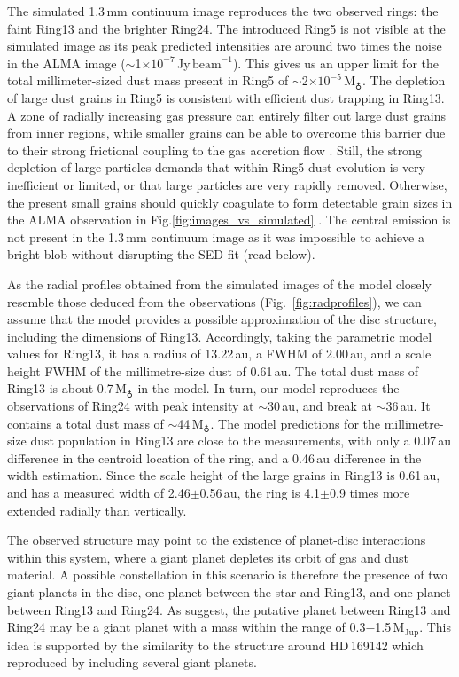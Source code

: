 \documentclass[usenatbib,times]{mnras}
\begin{document}
The simulated 1.3\,mm continuum image reproduces the two observed rings: the faint Ring13 and the brighter Ring24. The introduced Ring5 is not visible at the simulated image as its peak predicted intensities are around two times the noise in the ALMA image ($\sim$1$\times10^{-7}$\,Jy\,$\mathrm{beam}^{-1}$). This gives us an upper limit for the total millimeter-sized dust mass present in Ring5 of $\sim$2$\times10^{-5}$\,M$_{\earth}$. The depletion of large dust grains in Ring5 is consistent with efficient dust trapping in Ring13. A zone of radially increasing gas pressure can entirely filter out large dust grains from inner regions, while smaller grains can be able to overcome this barrier due to their strong frictional coupling to the gas accretion flow \citep[studied in the context of planetary gaps,][]{Rice2006,Zhu2012,Weber2018}. Still, the strong depletion of large particles demands that within Ring5 dust evolution is very inefficient or limited, or that large particles are very rapidly removed. Otherwise, the present small grains should quickly coagulate to form detectable grain sizes in the ALMA observation in Fig.\ref{fig:images_vs_simulated}  \citep{Drazkowska2019}. The central emission is not present in the 1.3\,mm continuum image as it was impossible to achieve a bright blob without disrupting the SED fit (read below).

As the radial profiles obtained from the simulated images of the model closely resemble those deduced from the observations (Fig.~\ref{fig:radprofiles}), we can assume that the model provides a possible approximation of the disc structure, including the dimensions of Ring13. Accordingly, taking the parametric model values for Ring13, it has a radius of 13.22\,au, a FWHM of 2.00\,au, and a scale height FWHM of the millimetre-size dust of 0.61\,au. The total dust mass of Ring13 is about 0.7\,M$_{\earth}$ in the model. In turn, our model reproduces the observations of Ring24 with peak intensity at $\sim$30\,au, and break at $\sim$36\,au. It contains a total dust mass of $\sim$44\,M$_{\earth}$. The model predictions for the millimetre-size dust population in Ring13 are close to the measurements, with only a 0.07\,au difference in the centroid location of the ring, and a 0.46\,au difference in the width estimation. Since  the  scale height of the large grains in Ring13 is  0.61\,au, and has a  measured width of 2.46$\pm$0.56\,au, the ring is 4.1$\pm$0.9 times more extended radially than vertically.

The observed structure may point to the existence of planet-disc interactions within this system, where a giant planet depletes its orbit of gas and dust material. A possible  constellation in this scenario is therefore the presence of two giant planets in the disc, one planet between the star and Ring13, and one planet between Ring13 and Ring24. As \citet{Ru_z_Rodr_guez_2019} suggest, the putative planet between Ring13 and Ring24 may be a giant planet with a mass within the range of 0.3$-$1.5\,$\mathrm{M}_{\mathrm{Jup}}$. This idea is supported by the similarity to the structure around HD\,169142 which \citet{2020arXiv200711565B} reproduced by including several giant planets. 
\end{document}
